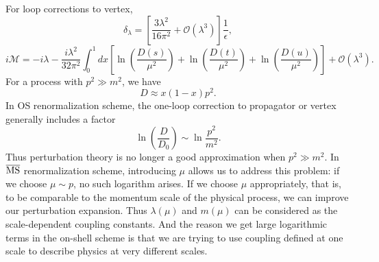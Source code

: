 For loop corrections to vertex,
\[\delta_{\lambda} = \left[\frac{3\lambda^2}{16\pi^2} + \mathcal{O}(\lambda^3)\right]\frac{1}{\epsilon},\]
\[i\mathcal{M} = -i\lambda -\frac{i\lambda^2}{32\pi^2} \int_0^1 dx \left[\ln(\frac{D(s)}{\mu^2}) +\ln(\frac{D(t)}{\mu^2})+\ln(\frac{D(u)}{\mu^2})\right] + \mathcal{O}(\lambda^3).\]
For a process with $p^2 \gg m^2$, we have
\[ D \approx x(1-x)p^2.\]
In OS renormalization scheme, the one-loop correction to propagator or vertex generally includes a factor
\[\ln \left( \frac{D}{D_0}\right ) \sim \ln \frac{p^2}{m^2}.\]
Thus perturbation theory is no longer a good approximation when $p^2 \gg m^2$.
In $\overline{\rm MS}$ renormalization scheme, introducing $\mu$ allows us to address this problem: if we choose $\mu \sim p$, no such logarithm arises. 
If we choose $\mu$ appropriately, that is, to be comparable to the momentum scale of the physical process, we can improve our perturbation expansion. 
Thus $\lambda(\mu)$ and $m(\mu)$ can be considered as the scale-dependent coupling constants.
And the reason we get large logarithmic terms in the on-shell scheme is that we are trying to use coupling defined at one scale to describe physics at very different scales.

